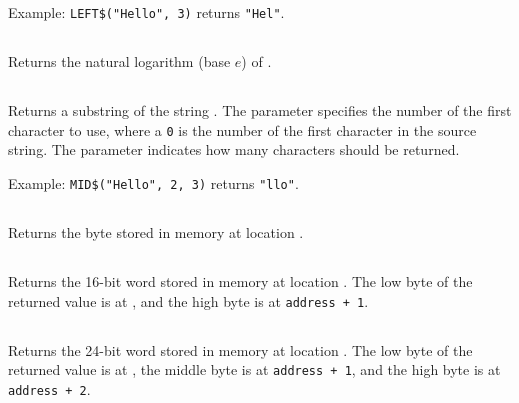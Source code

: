 \documentclass{report}
\begin{document}
    Example: \verb+LEFT$("Hello", 3)+ returns \verb+"Hel"+.   

    \subsection*{}

    Returns the natural logarithm (base $e$) of .

    \subsection*{}

    Returns a substring of the string .
    The parameter  specifies the number of the first character to use, where
    a \verb+0+ is the number of the first character in the source string.
    The parameter  indicates how many characters should be returned.

    Example: \verb+MID$("Hello", 2, 3)+ returns \verb+"llo"+.

    \subsection*{}

    Returns the byte stored in memory at location .

    \subsection*{}

    Returns the 16-bit word stored in memory at location .
    The low byte of the returned value is at , and the
    high byte is at \verb-address + 1-.

    \subsection*{}

    Returns the 24-bit word stored in memory at location .
    The low byte of the returned value is at ,
    the middle byte is at \verb-address + 1-, 
    and the high byte is at \verb-address + 2-.

    \subsection*{}
\end{document}
